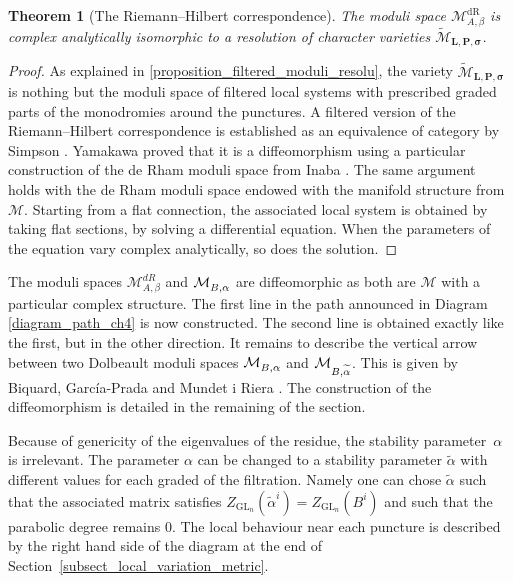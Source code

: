 \documentclass[JEP,XML,SOM,NoEqCountersInSection,Unicode,published]{cedram}
\newcommand{\NoChangel}[1]{%
\expandafter\let\csname old\string#1\endcsname=#1
\let#1=\relax
\newcommand{#1}{\mathcode`l="716C\csname old\string#1\endcsname\mathcode`l="7160 }%
}
\newcommand{\Dol}{\mathrm{Dol}}\NoChangel{\Dol}
\newcommand{\dR}{\mathrm{dR}}
\theoremstyle{definition}
\theoremstyle{plain}
\newtheorem{theorem}[definition]{Theorem}
\DeclareMathOperator{\GL}{GL}
\newcommand{\mlps}{\widetilde{\mathcal{M}}_{\boldsymbol{L},\boldsymbol{P},\boldsymbol{\sigma}}}
\begin{document}
\begin{theorem}[The Riemann--Hilbert correspondence]
The moduli space $\mathcal{M}^{\dR}_{A,\beta}$ is complex analytically isomorphic to a resolution of character varieties $\mlps$.
\end{theorem}
\begin{proof}
As explained in \ref{proposition_filtered_moduli_resolu}, the variety $\mlps$ is nothing but the moduli space of filtered local systems with prescribed graded parts of the monodromies around the punctures. A filtered version of the Riemann--Hilbert correspondence is established as an equivalence of category by Simpson \cite{Simpson}. Yamakawa \cite{Yamakawa} proved that it is a diffeomorphism using a particular construction of the de Rham moduli space from Inaba \cite{Inaba13}. The same argument holds with the de Rham moduli space endowed with the manifold structure from $\mathcal{M}$. Starting from a flat connection, the associated local system is obtained by taking flat sections, \ie by solving a differential equation. When the parameters of the equation vary complex analytically, so does the solution.
\end{proof}

The moduli spaces $\mathcal{M}^{dR}_{A,\beta}$ and $\mathcal{M}^{\Dol}_{B,\alpha}$ are diffeomorphic as both are $\mathcal{M}$ with a particular complex structure. The first line in the path announced in Diagram \ref{diagram_path_ch4} is now constructed. The second line is obtained exactly like the first, but in the other direction. It remains to describe the vertical arrow between two Dolbeault moduli spaces $\mathcal{M}^{\Dol}_{B,\alpha}$ and $\mathcal{M}^{\Dol}_{B,\widetilde{\alpha}}$. This is given by Biquard, García-Prada and Mundet i Riera \cite[Th.\,7.10]{Biquard_Garcia_Prada_Riera}. The construction of the diffeomorphism is detailed in the remaining of the section.

Because of genericity of the eigenvalues of the residue, the stability parameter~$\alpha$ is irrelevant. The parameter $\alpha$ can be changed to a stability parameter $\widetilde{\alpha}$ with different values for each graded of the filtration. Namely one can chose $\widetilde{\alpha}$ such that the associated matrix satisfies $Z_{\GL_n}(\widetilde{\alpha}^{i})=Z_{\GL_n}(B^i)$ and such that the parabolic degree remains $0$. The local behaviour near each puncture is described by the right hand side of the diagram at the end of Section~\ref{subsect_local_variation_metric}.
\end{document}
